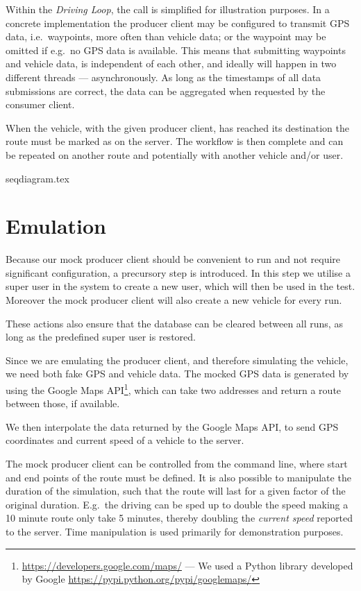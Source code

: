 Within the \textit{Driving Loop}, the  call is simplified for illustration purposes. %
In a concrete implementation the producer client may be configured to transmit GPS data, i.e.~waypoints, more often than vehicle data;
or the waypoint may be omitted if e.g.~no GPS data is available.
This means that submitting waypoints and vehicle data, is independent of each other, and ideally will happen in two different threads --- asynchronously.
As long as the timestamps of all data submissions are correct, the data can be aggregated when requested by the consumer client.

When the vehicle, with the given producer client, has reached its destination the route must be marked as  on the server.
The workflow is then complete and can be repeated on another route and potentially with another vehicle and/or user.

{seqdiagram.tex}

\section{Emulation}
Because our mock producer client should be convenient to run and not require significant configuration, a precursory step is introduced.
In this step we utilise a super user in the system to create a new user, which will then be used in the test.
Moreover the mock producer client will also create a new vehicle for every run.

These actions also ensure that the database can be cleared between all runs, as long as the predefined super user is restored.

\bigskip
Since we are emulating the producer client, and therefore simulating the vehicle, we need both fake GPS and vehicle data.
The mocked GPS data is generated by using the Google Maps API\footnote{\url{https://developers.google.com/maps/} --- We used a Python library developed by Google \url{https://pypi.python.org/pypi/googlemaps/}}, which can take two addresses and return a route between those, if available.

We then interpolate the data returned by the Google Maps API, to send GPS coordinates and current speed of a vehicle to the server.

The mock producer client can be controlled from the command line, where start and end points of the route must be defined.
It is also possible to manipulate the duration of the simulation, such that the route will last for a given factor of the original duration.
E.g.~the driving can be sped up to double the speed making a 10 minute route only take 5 minutes, thereby doubling the \textit{current speed} reported to the server.
Time manipulation is used primarily for demonstration purposes.


